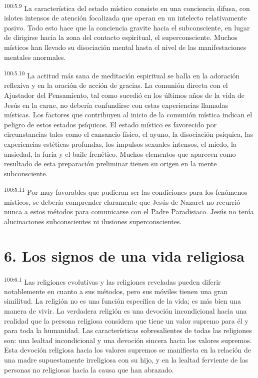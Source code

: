 \par
\textsuperscript{100:5.9} La característica del estado místico consiste en una conciencia difusa, con islotes intensos de atención focalizada que operan en un intelecto relativamente pasivo. Todo esto hace que la conciencia gravite hacia el subconsciente, en lugar de dirigirse hacia la zona del contacto espiritual, el superconsciente. Muchos místicos han llevado su disociación mental hasta el nivel de las manifestaciones mentales anormales.

\par
\textsuperscript{100:5.10} La actitud más sana de meditación espiritual se halla en la adoración reflexiva y en la oración de acción de gracias. La comunión directa con el Ajustador del Pensamiento, tal como sucedió en los últimos años de la vida de Jesús en la carne, no debería confundirse con estas experiencias llamadas místicas. Los factores que contribuyen al inicio de la comunión mística indican el peligro de estos estados psíquicos. El estado místico es favorecido por circunstancias tales como el cansancio físico, el ayuno, la disociación psíquica, las experiencias estéticas profundas, los impulsos sexuales intensos, el miedo, la ansiedad, la furia y el baile frenético. Muchos elementos que aparecen como resultado de esta preparación preliminar tienen su origen en la mente subconsciente.

\par
\textsuperscript{100:5.11} Por muy favorables que pudieran ser las condiciones para los fenómenos místicos, se debería comprender claramente que Jesús de Nazaret no recurrió nunca a estos métodos para comunicarse con el Padre Paradisiaco. Jesús no tenía alucinaciones subconscientes ni ilusiones superconscientes.

\section*{6. Los signos de una vida religiosa}
\par
\textsuperscript{100:6.1} Las religiones evolutivas y las religiones reveladas pueden diferir notablemente en cuanto a sus métodos, pero sus móviles tienen una gran similitud. La religión no es una función específica de la vida; es más bien una manera de vivir. La verdadera religión es una devoción incondicional hacia una realidad que la persona religiosa considera que tiene un valor supremo para él y para toda la humanidad. Las características sobresalientes de todas las religiones son: una lealtad incondicional y una devoción sincera hacia los valores supremos. Esta devoción religiosa hacia los valores supremos se manifiesta en la relación de una madre supuestamente irreligiosa con su hijo, y en la lealtad ferviente de las personas no religiosas hacia la causa que han abrazado.

